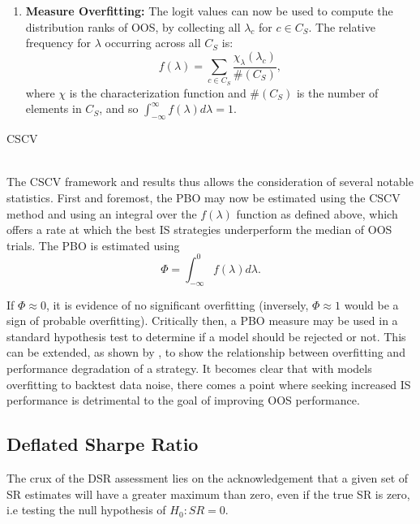 \documentclass[a4paper,11pt,oneside]{article}
\theoremstyle{plain}
\theoremstyle{definition}
\begin{document}
\begin{algorithm}[H]
\begin{enumerate}
\begin{enumerate}
			\end{enumerate}
			\item \textbf{Measure Overfitting:} The logit values can now be used to compute the distribution ranks of OOS, by collecting all $\lambda_c$ for $c \in C_S$. The relative frequency for $\lambda$ occurring across all $C_S$ is:
			\begin{equation}
			f(\lambda) = \sum_{c \in C_S}\frac{\chi_{\lambda}(\lambda_c)}{\#(C_S)} ,
			\end{equation}
			where $\chi$ is the characterization function and $\#(C_S)$ is the number of elements in $C_S$, and so $\int_{-\infty}^{\infty} f (\lambda) d \lambda = 1$.
		\end{enumerate}
		
		\label{algo_cscv}
		\caption{CSCV}
	\end{algorithm}
	
	
	
	\texttt{\\}
	\newline The CSCV framework and results thus allows the consideration of several notable statistics. First and foremost, 
	the PBO may now be estimated using the CSCV method and using an integral over the $f(\lambda)$ function 
	as defined above, which offers a rate at which the best IS strategies underperform the median of OOS trials. The PBO is estimated using
	\begin{equation}
	\Phi = \int_{-\infty}^{0} f (\lambda) d \lambda .
	\end{equation}
	
	
	If $\Phi \approx 0$,
	it is evidence of no significant overfitting (inversely, $\Phi \approx 1$ would be a sign of probable overfitting). Critically then, a PBO measure may be used in a standard hypothesis test to determine if a model should be rejected or not. This 
	can be extended, as shown by \citet{BailyPBO}, to show the relationship between overfitting and performance 
	degradation of a strategy. It becomes clear that with models overfitting to backtest data noise, there comes a point 
	where seeking increased IS performance is detrimental to the goal of improving OOS performance.  
	\hfill \break 
	
	
	\subsection{Deflated Sharpe Ratio}\label{imp_dsr}
	
	The crux of the DSR assessment lies on the acknowledgement that a given set of SR estimates will have a greater maximum than zero, even if the true SR is zero, i.e testing the null hypothesis of $H_0:SR=0$. \newline
	
\end{document}
